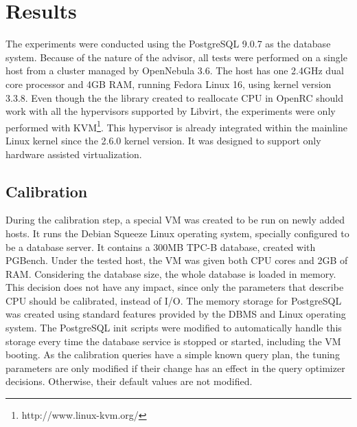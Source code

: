 \chapter{Results}

\label{chap:results}

The experiments were conducted using the PostgreSQL 9.0.7 as the database system. Because of the nature of the advisor, all tests were performed on a single host from a cluster managed by OpenNebula 3.6. The host has one 2.4GHz dual core processor and 4GB RAM, running Fedora Linux 16, using kernel version 3.3.8. Even though the the library created to reallocate CPU in OpenRC should work with all the hypervisors supported by Libvirt, the experiments were only performed with KVM\footnote{http://www.linux-kvm.org/}. This hypervisor is already integrated within the mainline Linux kernel since the 2.6.0 kernel version. It was designed to support only hardware assisted virtualization.

\section{Calibration}

During the calibration step, a special VM was created to be run on newly added hosts. It runs the Debian Squeeze Linux operating system, specially configured to be a database server. It contains a 300MB TPC-B database, created with PGBench. Under the tested host, the VM was given both CPU cores and 2GB of RAM. Considering the database size, the whole database is loaded in memory. This decision does not have any impact, since only the parameters that describe CPU should be calibrated, instead of I/O. The memory storage for PostgreSQL was created using standard features provided by the DBMS and Linux operating system. The PostgreSQL init scripts were modified to automatically handle this storage every time the database service is stopped or started, including the VM booting. As the calibration queries have a simple known query plan, the tuning parameters are only modified if their change has an effect in the query optimizer decisions. Otherwise, their default values are not modified.

